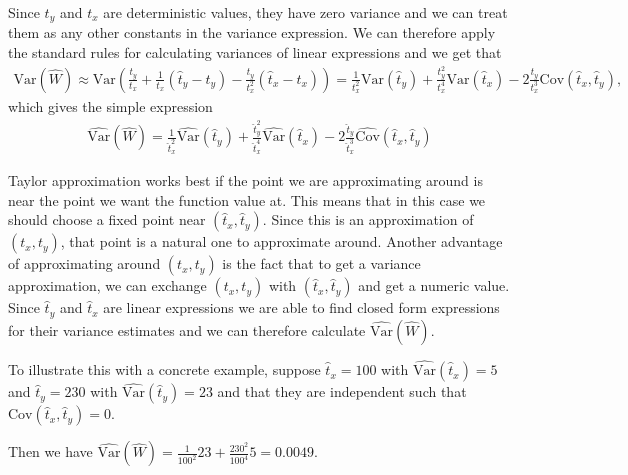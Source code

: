 \documentclass{article}
\begin{document}
\begin{example}
    Since \(t_y\) and \(t_x\) are deterministic values, they have zero variance
    and we can treat them as any other constants in the variance expression. We can therefore apply
    the standard rules for calculating variances of linear expressions and we
    get that
    \begin{align*}
      \mathrm{Var} \left( \widehat{W} \right) \approx \mathrm{Var} \left(
      \frac{t_y}{t_x} + \frac{1}{t_x} \left( \hat{t}_y - t_y \right) -
      \frac{t_y}{t_x^2} \left( \hat{t}_x - t_x \right) \right)
    = \frac{1}{t_x^2} \mathrm{Var} \left( \hat{t}_y \right) +
      \frac{t_y^2}{t_x^4} \mathrm{Var} \left( \hat{t}_x \right) -
      2 \frac{t_y}{t_x^3}\mathrm{Cov}(\hat{t}_x, \hat{t}_y),
      \end{align*}
      which gives the simple expression \begin{align*}
                    \widehat{\mathrm{Var}} \left( \widehat{W} \right) = \frac{1}{\hat{t}_x^2} \widehat{\mathrm{Var}} \left( \hat{t}_y \right) +
                    \frac{\hat{t}_y^2}{\hat{t}_x^4} \widehat{\mathrm{Var}} \left( \hat{t}_x \right) - 2 \frac{\hat{t}_y}{\hat{t}_x^3}\widehat{\mathrm{Cov}}(\hat{t}_x, \hat{t}_y)
                    \end{align*}

    Taylor approximation works best if the point we are approximating around is
    near the point we want the function value at. This means that in this case we should
    choose a fixed point near \((\hat{t}_x, \hat{t}_y)\). Since this is an approximation
    of \((t_x, t_y)\), that point is a natural one to approximate around. Another
    advantage of approximating around \((t_x, t_y)\) is the fact that to get a
    variance approximation, we can exchange \((t_x,
    t_y)\) with \((\hat{t}_x, \hat{t}_y)\) and get a numeric value.
    Since \(\hat{t}_y\) and \(\hat{t}_x\) are linear expressions we are able to
    find closed form expressions for their variance estimates and we can
    therefore calculate \(\widehat{\mathrm{Var}} \left( \widehat{W} \right)\).

    To illustrate this with a concrete example, suppose \(\hat{t}_x = 100\) with
    \(\widehat{\mathrm{Var}}\left( \hat{t}_x \right) = 5\) and \(\hat{t}_y = 230\) with
    \(\widehat{\mathrm{Var}}\left( \hat{t}_y \right) = 23\) and that they are independent
    such that \(\mathrm{Cov} \left( \hat{t}_x, \hat{t}_y \right) = 0\).

    Then we have \(\widehat{\mathrm{Var}} \left( \widehat{W} \right) =
    \frac{1}{100^2} 23 + \frac{230^2}{100^4} 5 = 0.0049.\)

\end{example}
\end{document}
